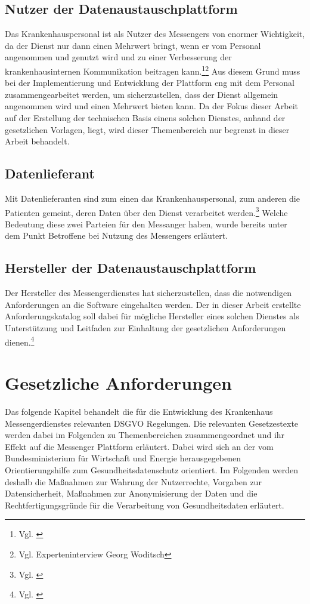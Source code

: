 \subsection{Nutzer der Datenaustauschplattform}\label{subsection:ndd}
Das Krankenhauspersonal ist als Nutzer des Messengers von enormer Wichtigkeit, da der Dienst nur dann einen Mehrwert bringt, wenn er vom Personal angenommen und genutzt wird und zu einer Verbesserung der krankenhausinternen Kommunikation beitragen kann.\footnote{Vgl. \cite[S. 13]{Bundesverband-Gesundheits-IT-e.V.2016}}\footnote{Vgl. Experteninterview Georg Woditsch} Aus diesem Grund muss bei der Implementierung und Entwicklung der Plattform eng mit dem Personal zusammengearbeitet werden, um sicherzustellen, dass der Dienst allgemein angenommen wird und einen Mehrwert bieten kann. Da der Fokus dieser Arbeit auf der Erstellung der technischen Basis einens solchen Dienstes, anhand der gesetzlichen Vorlagen, liegt, wird dieser Themenbereich nur begrenzt in dieser Arbeit behandelt. 

\subsection{Datenlieferant}\label{subsection:hdd}
Mit Datenlieferanten sind zum einen das Krankenhauspersonal, zum anderen die Patienten gemeint, deren Daten über den Dienst verarbeitet werden.\footnote{Vgl. \cite[S. 13]{Bundesverband-Gesundheits-IT-e.V.2016}} Welche Bedeutung diese zwei Parteien für den Messanger haben, wurde bereits unter dem Punkt \glqq Betroffene bei Nutzung des Messengers\grqq{} erläutert.

\subsection{Hersteller der Datenaustauschplattform}\label{subsection:hdd}
Der Hersteller des Messengerdienstes hat sicherzustellen, dass die notwendigen Anforderungen an die Software eingehalten werden.
Der in dieser Arbeit erstellte Anforderungskatalog soll dabei für mögliche Hersteller eines solchen Dienstes als Unterstützung und Leitfaden zur Einhaltung der gesetzlichen Anforderungen dienen.\footnote{Vgl. \cite[S. 13]{Bundesverband-Gesundheits-IT-e.V.2016}}

\section{Gesetzliche Anforderungen}\label{section:dsgvo}
Das folgende Kapitel behandelt die für die Entwicklung des Krankenhaus Messengerdienstes relevanten DSGVO Regelungen. Die relevanten Gesetzestexte werden dabei im Folgenden zu Themenbereichen zusammengeordnet und ihr Effekt auf die Messenger Plattform erläutert. Dabei wird sich an der vom Bundesministerium für Wirtschaft und Energie herausgegebenen Orientierungshilfe zum Gesundheitsdatenschutz orientiert. Im Folgenden werden deshalb die Maßnahmen zur Wahrung der Nutzerrechte, Vorgaben zur Datensicherheit, Maßnahmen zur Anonymisierung der Daten und die Rechtfertigungsgründe für die Verarbeitung von Gesundheitsdaten erläutert.

